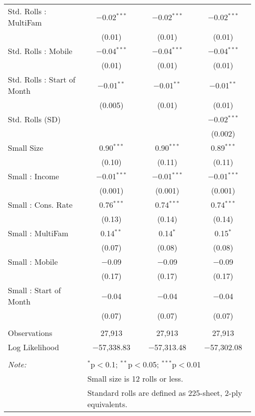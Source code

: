 \begin{table}[!htbp]
\begin{tabular}{@{\extracolsep{5pt}}lccc}
  Std. Rolls : MultiFam & $-$0.02$^{***}$ & $-$0.02$^{***}$ & $-$0.02$^{***}$ \\ 
  & (0.01) & (0.01) & (0.01) \\ 
  Std. Rolls : Mobile & $-$0.04$^{***}$ & $-$0.04$^{***}$ & $-$0.04$^{***}$ \\ 
  & (0.01) & (0.01) & (0.01) \\ 
  Std. Rolls : Start of Month & $-$0.01$^{**}$ & $-$0.01$^{**}$ & $-$0.01$^{**}$ \\ 
  & (0.005) & (0.01) & (0.01) \\ 
  Std. Rolls (SD) &  &  & $-$0.02$^{***}$ \\ 
  &  &  & (0.002) \\ 
  Small Size & 0.90$^{***}$ & 0.90$^{***}$ & 0.89$^{***}$ \\ 
  & (0.10) & (0.11) & (0.11) \\ 
  Small : Income & $-$0.01$^{***}$ & $-$0.01$^{***}$ & $-$0.01$^{***}$ \\ 
  & (0.001) & (0.001) & (0.001) \\ 
  Small : Cons. Rate & 0.76$^{***}$ & 0.74$^{***}$ & 0.74$^{***}$ \\ 
  & (0.13) & (0.14) & (0.14) \\ 
  Small : MultiFam & 0.14$^{**}$ & 0.14$^{*}$ & 0.15$^{*}$ \\ 
  & (0.07) & (0.08) & (0.08) \\ 
  Small : Mobile & $-$0.09 & $-$0.09 & $-$0.09 \\ 
  & (0.17) & (0.17) & (0.17) \\ 
  Small : Start of Month & $-$0.04 & $-$0.04 & $-$0.04 \\ 
  & (0.07) & (0.07) & (0.07) \\ 
 \hline \\[-1.8ex] 
Observations & 27,913 & 27,913 & 27,913 \\ 
Log Likelihood & $-$57,338.83 & $-$57,313.48 & $-$57,302.08 \\ 
\hline 
\hline \\[-1.8ex] 
\textit{Note:}  & \multicolumn{3}{l}{$^{*}$p$<$0.1; $^{**}$p$<$0.05; $^{***}$p$<$0.01} \\ 
 & \multicolumn{3}{l}{Small size is 12 rolls or less.} \\ 
 & \multicolumn{3}{l}{Standard rolls are defined as 225-sheet, 2-ply equivalents.} \\ 
\end{tabular} 
\end{table} 

